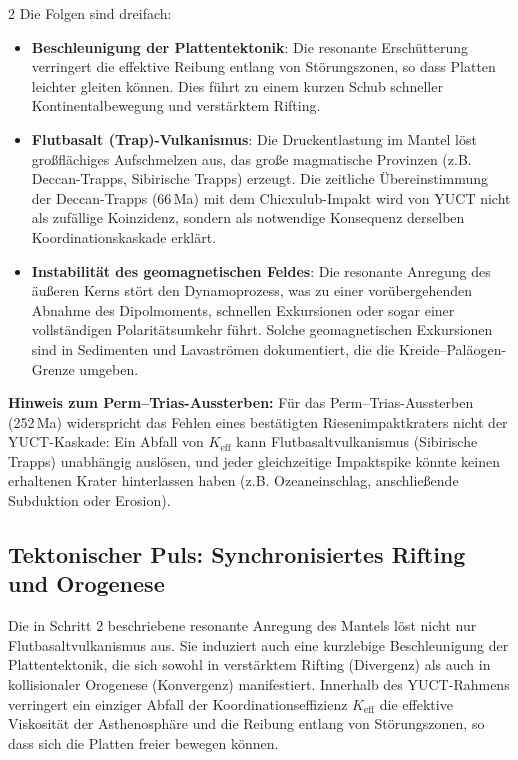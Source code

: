 \documentclass[11pt,a4paper]{article}
\begin{document}
\begin{multicols}{2}
		Die Folgen sind dreifach:
		\begin{itemize}
			\item \textbf{Beschleunigung der Plattentektonik}: Die resonante Erschütterung
			verringert die effektive Reibung entlang von Störungszonen, so dass Platten
			leichter gleiten können. Dies führt zu einem kurzen Schub schneller Kontinentalbewegung und verstärktem Rifting.
			\item \textbf{Flutbasalt (Trap)-Vulkanismus}: Die Druckentlastung
			im Mantel löst großflächiges Aufschmelzen aus, das große magmatische Provinzen
			(z.B. Deccan-Trapps, Sibirische Trapps) erzeugt. Die zeitliche Übereinstimmung der Deccan-Trapps (66 Ma) mit dem Chicxulub-Impakt wird von YUCT nicht als zufällige Koinzidenz, sondern als notwendige Konsequenz derselben Koordinationskaskade erklärt.
			\item \textbf{Instabilität des geomagnetischen Feldes}: Die resonante Anregung
			des äußeren Kerns stört den Dynamoprozess, was zu einer vorübergehenden
			Abnahme des Dipolmoments, schnellen Exkursionen oder sogar einer vollständigen
			Polaritätsumkehr führt. Solche geomagnetischen Exkursionen sind in Sedimenten und Lavaströmen dokumentiert, die die Kreide–Paläogen-Grenze umgeben.
		\end{itemize}
		
		\noindent
		\textbf{Hinweis zum Perm–Trias-Aussterben:}
		Für das Perm–Trias-Aussterben (252 Ma) widerspricht das Fehlen eines bestätigten
		Riesenimpaktkraters nicht der YUCT-Kaskade: Ein Abfall von
		\(K_{\mathrm{eff}}\) kann Flutbasaltvulkanismus (Sibirische Trapps) unabhängig auslösen, und jeder gleichzeitige Impaktspike könnte keinen erhaltenen Krater hinterlassen haben (z.B. Ozeaneinschlag, anschließende Subduktion oder Erosion).
		
		\subsection{Tektonischer Puls: Synchronisiertes Rifting und Orogenese}
		
		Die in Schritt 2 beschriebene resonante Anregung des Mantels löst nicht nur Flutbasaltvulkanismus aus.
		Sie induziert auch eine kurzlebige Beschleunigung der Plattentektonik, die sich sowohl in verstärktem Rifting
		(Divergenz) als auch in kollisionaler Orogenese (Konvergenz) manifestiert. Innerhalb des YUCT-Rahmens verringert ein einziger Abfall der Koordinationseffizienz \(K_{\mathrm{eff}}\) die effektive Viskosität der Asthenosphäre und die Reibung entlang von Störungszonen, so dass sich die Platten freier bewegen können.
		

\end{multicols}
\end{document}
